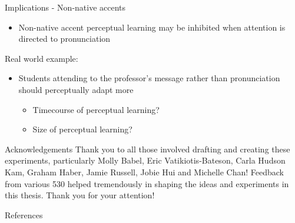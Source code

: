 \documentclass{beamer}
\begin{document}
\begin{frame}{Implications - Non-native accents}
\begin{itemize}
\item Non-native accent perceptual learning may be inhibited when attention is directed to pronunciation
\end{itemize}
Real world example:
\begin{itemize}
\item Students attending to the professor's message rather than pronunciation should perceptually adapt more
\begin{itemize}
\item Timecourse of perceptual learning?
\item Size of perceptual learning?
\end{itemize}
\end{itemize}

\end{frame}

\begin{frame}{Acknowledgements}
\centering
\vfill
Thank you to all those involved drafting and creating these experiments, particularly Molly Babel, Eric Vatikiotis-Bateson, Carla Hudson Kam, Graham Haber, Jamie Russell, Jobie Hui and Michelle Chan!
\vfill
Feedback from various 530 helped tremendously in shaping the ideas and experiments in this thesis.
\vfill
Thank you for your attention!
\vfill
\end{frame}

\begin{frame}[allowframebreaks]{References}%
    \footnotesize


    
\end{frame}
\end{document}
